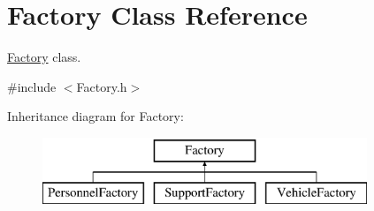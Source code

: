 \hypertarget{classFactory}{}\section{Factory Class Reference}
\label{classFactory}


\hyperlink{classFactory}{Factory} class.  




{\ttfamily \#include $<$Factory.\+h$>$}

Inheritance diagram for Factory\+:\begin{figure}[H]
\begin{center}
\leavevmode
\includegraphics[height=2.000000cm]{classFactory}
\end{center}
\end{figure}
